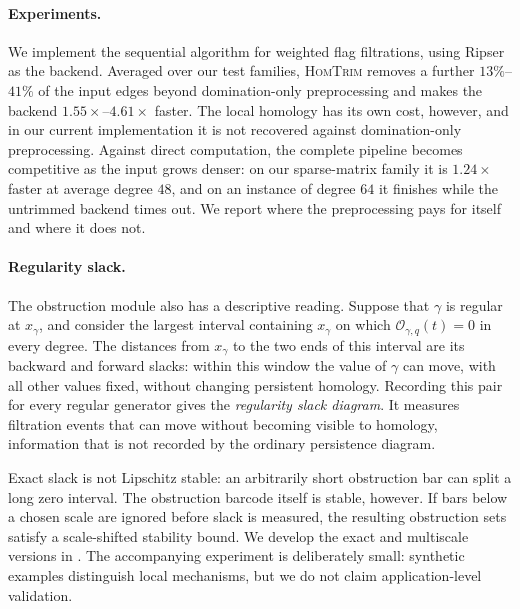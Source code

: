 \documentclass[11pt,letterpaper]{article}
\theoremstyle{definition}
\newcommand{\Oc}{\mathcal O}
\begin{document}
\paragraph{Experiments.}
We implement the sequential algorithm for weighted flag filtrations, using
Ripser \cite{Bauer2021} as the backend. Averaged over our test families,
\textsc{HomTrim} removes a further $13\%$--$41\%$ of the input edges beyond
domination-only preprocessing and makes the backend $1.55\times$--$4.61\times$
faster. The
local homology has its own cost, however, and in our current implementation it
is not recovered against domination-only preprocessing. Against direct
computation, the complete pipeline becomes competitive as the input grows
denser: on our sparse-matrix family it is $1.24\times$ faster at average
degree $48$, and on an instance of degree $64$ it finishes while the untrimmed
backend times out. We report where the preprocessing pays for itself and where it does not.

\paragraph{Regularity slack.}
The obstruction module also has a descriptive reading. Suppose that $\gamma$
is regular at $x_\gamma$, and consider the largest interval containing
$x_\gamma$ on which $\Oc_{\gamma,q}(t)=0$ in every degree. The distances from
$x_\gamma$ to the two ends of this interval are its backward and forward
slacks: within this window the value of $\gamma$ can move, with all other
values fixed, without changing persistent homology. Recording this pair for
every regular generator gives the \emph{regularity slack diagram}. It
measures filtration events that can move without becoming visible to
homology, information that is not recorded by the ordinary persistence
diagram.

Exact slack is not Lipschitz stable: an arbitrarily short obstruction bar can
split a long zero interval. The obstruction barcode itself is stable, however.
If bars below a chosen scale are ignored before slack is measured, the
resulting obstruction sets satisfy a scale-shifted stability bound. We develop
the exact and multiscale versions in . The accompanying
experiment is deliberately small: synthetic examples distinguish local
mechanisms, but we do not claim application-level validation.
\end{document}
